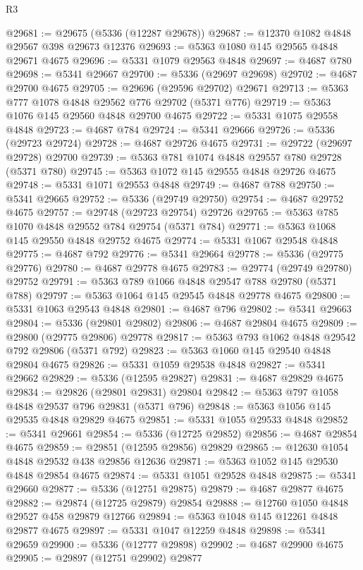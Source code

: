\begin{lexlean}{R3}
\begin{coremodule}
@29681 := @29675 (@5336 (@12287 @29678))
@29687 := @12370 @1082 @4848 @29567 @398 @29673 @12376
@29693 := @5363 @1080 @145 @29565 @4848 @29671 @4675
@29696 := @5331 @1079 @29563 @4848
@29697 := @4687 @780
@29698 := @5341 @29667
@29700 := @5336 (@29697 @29698)
@29702 := @4687 @29700 @4675
@29705 := @29696 (@29596 @29702) @29671
@29713 := @5363 @777 @1078 @4848 @29562 @776 @29702 (@5371 @776)
@29719 := @5363 @1076 @145 @29560 @4848 @29700 @4675
@29722 := @5331 @1075 @29558 @4848
@29723 := @4687 @784
@29724 := @5341 @29666
@29726 := @5336 (@29723 @29724)
@29728 := @4687 @29726 @4675
@29731 := @29722 (@29697 @29728) @29700
@29739 := @5363 @781 @1074 @4848 @29557 @780 @29728 (@5371 @780)
@29745 := @5363 @1072 @145 @29555 @4848 @29726 @4675
@29748 := @5331 @1071 @29553 @4848
@29749 := @4687 @788
@29750 := @5341 @29665
@29752 := @5336 (@29749 @29750)
@29754 := @4687 @29752 @4675
@29757 := @29748 (@29723 @29754) @29726
@29765 := @5363 @785 @1070 @4848 @29552 @784 @29754 (@5371 @784)
@29771 := @5363 @1068 @145 @29550 @4848 @29752 @4675
@29774 := @5331 @1067 @29548 @4848
@29775 := @4687 @792
@29776 := @5341 @29664
@29778 := @5336 (@29775 @29776)
@29780 := @4687 @29778 @4675
@29783 := @29774 (@29749 @29780) @29752
@29791 := @5363 @789 @1066 @4848 @29547 @788 @29780 (@5371 @788)
@29797 := @5363 @1064 @145 @29545 @4848 @29778 @4675
@29800 := @5331 @1063 @29543 @4848
@29801 := @4687 @796
@29802 := @5341 @29663
@29804 := @5336 (@29801 @29802)
@29806 := @4687 @29804 @4675
@29809 := @29800 (@29775 @29806) @29778
@29817 := @5363 @793 @1062 @4848 @29542 @792 @29806 (@5371 @792)
@29823 := @5363 @1060 @145 @29540 @4848 @29804 @4675
@29826 := @5331 @1059 @29538 @4848
@29827 := @5341 @29662
@29829 := @5336 (@12595 @29827)
@29831 := @4687 @29829 @4675
@29834 := @29826 (@29801 @29831) @29804
@29842 := @5363 @797 @1058 @4848 @29537 @796 @29831 (@5371 @796)
@29848 := @5363 @1056 @145 @29535 @4848 @29829 @4675
@29851 := @5331 @1055 @29533 @4848
@29852 := @5341 @29661
@29854 := @5336 (@12725 @29852)
@29856 := @4687 @29854 @4675
@29859 := @29851 (@12595 @29856) @29829
@29865 := @12630 @1054 @4848 @29532 @438 @29856 @12636
@29871 := @5363 @1052 @145 @29530 @4848 @29854 @4675
@29874 := @5331 @1051 @29528 @4848
@29875 := @5341 @29660
@29877 := @5336 (@12751 @29875)
@29879 := @4687 @29877 @4675
@29882 := @29874 (@12725 @29879) @29854
@29888 := @12760 @1050 @4848 @29527 @458 @29879 @12766
@29894 := @5363 @1048 @145 @12261 @4848 @29877 @4675
@29897 := @5331 @1047 @12259 @4848
@29898 := @5341 @29659
@29900 := @5336 (@12777 @29898)
@29902 := @4687 @29900 @4675
@29905 := @29897 (@12751 @29902) @29877

\end{coremodule}
\end{lexlean}
